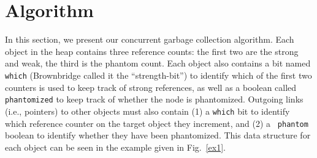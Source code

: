 %

\section{Algorithm}
\label{section:high-level}
In this section, we present our concurrent garbage collection algorithm.
Each object in the heap contains three reference counts: the first
two are the strong and weak, the third is the phantom count. Each object also
contains a bit named {\tt which} (Brownbridge \cite{Brownbridge1985} called it the ``strength-bit'')
to identify which of the first two counters is
used to keep track of strong references, as well as a boolean called {\tt
phantomized} to keep track of whether the node is phantomized.
Outgoing links (i.e., pointers) to other objects must also contain (1) a {\tt which} bit to
identify which reference counter on the target object they increment, and (2) a {\tt
phantom} boolean to identify whether they have been phantomized. This data structure for each object can be seen in the example given in Fig.~\ref{ex1}.


